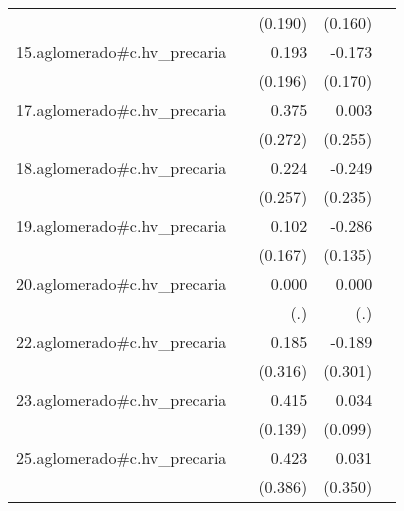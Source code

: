 {\begin{longtable}{l*{4}{D{.}{.}{-1}}}
            &                     &     (0.190)         &     (0.160)         &                     \\
\addlinespace
15.aglomerado#c.hv\_precaria&                     &       0.193         &      -0.173         &                     \\
            &                     &     (0.196)         &     (0.170)         &                     \\
\addlinespace
17.aglomerado#c.hv\_precaria&                     &       0.375         &       0.003         &                     \\
            &                     &     (0.272)         &     (0.255)         &                     \\
\addlinespace
18.aglomerado#c.hv\_precaria&                     &       0.224         &      -0.249         &                     \\
            &                     &     (0.257)         &     (0.235)         &                     \\
\addlinespace
19.aglomerado#c.hv\_precaria&                     &       0.102         &      -0.286\sym{*}  &                     \\
            &                     &     (0.167)         &     (0.135)         &                     \\
\addlinespace
20.aglomerado#c.hv\_precaria&                     &       0.000         &       0.000         &                     \\
            &                     &         (.)         &         (.)         &                     \\
\addlinespace
22.aglomerado#c.hv\_precaria&                     &       0.185         &      -0.189         &                     \\
            &                     &     (0.316)         &     (0.301)         &                     \\
\addlinespace
23.aglomerado#c.hv\_precaria&                     &       0.415\sym{**} &       0.034         &                     \\
            &                     &     (0.139)         &     (0.099)         &                     \\
\addlinespace
25.aglomerado#c.hv\_precaria&                     &       0.423         &       0.031         &                     \\
            &                     &     (0.386)         &     (0.350)         &                     \\

\end{longtable}}
